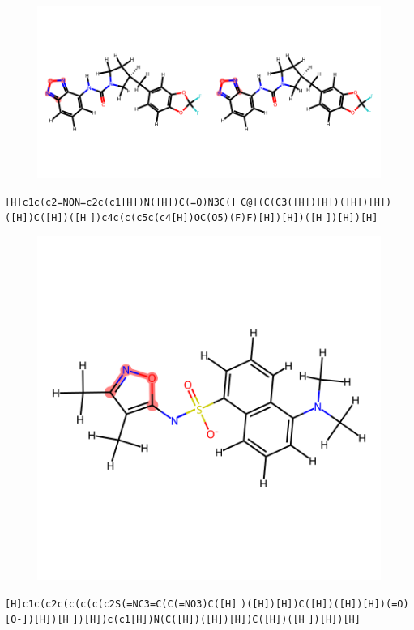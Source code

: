\documentclass{article}
\begin{document}
\begin{figure}[ht]
\centering
    \includegraphics{mol40.png}
\end{figure}
\verb|[H]c1c(c2=NON=c2c(c1[H])N([H])C(=O)N3C([| \verb|C@](C(C3([H])[H])([H])[H])([H])C([H])([H| \verb|])c4c(c(c5c(c4[H])OC(O5)(F)F)[H])[H])([H| \verb|])[H])[H]|

\begin{figure}[ht]
\centering
    \includegraphics{mol41.png}
\end{figure}
\verb|[H]c1c(c2c(c(c(c(c2S(=NC3=C(C(=NO3)C([H]| \verb|)([H])[H])C([H])([H])[H])(=O)[O-])[H])[H| \verb|])[H])c(c1[H])N(C([H])([H])[H])C([H])([H| \verb|])[H])[H]|
\end{document}
